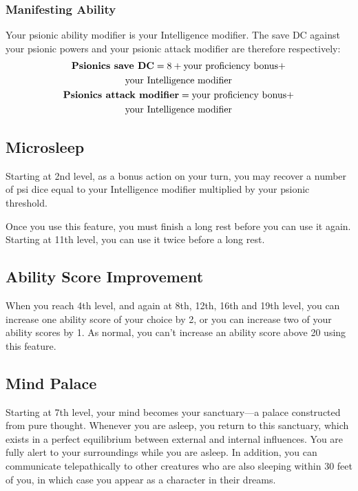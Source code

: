 \subsubsection{Manifesting Ability}
Your psionic ability modifier is your Intelligence modifier.
The save DC against your psionic powers and your
psionic attack modifier are therefore respectively:
\small\begin{equation*}
    \begin{gathered}
        \text{\textbf{Psionics save DC}}
            = 8 + \text{your proficiency bonus} + \\
                  \text{your Intelligence modifier} \\
        \text{\textbf{Psionics attack modifier}}
            = \text{your proficiency bonus} + \\
              \text{your Intelligence modifier}
    \end{gathered}
\end{equation*}\normalsize

\subsection{Microsleep}
Starting at 2nd level,
as a bonus action on your turn,
you may recover a number of psi dice equal to
your Intelligence modifier multiplied by your psionic threshold.

Once you use this feature,
you must finish a long rest before you can use it again.
Starting at 11th level,
you can use it twice before a long rest.

\subsection{Ability Score Improvement}
When you reach 4th level,
and again at 8th, 12th, 16th and 19th level,
you can increase one ability score of your choice by 2,
or you can increase two of your ability scores by 1.
As normal,
you can't increase an ability score above 20 using this feature.

\subsection{Mind Palace}
Starting at 7th level,
your mind becomes your sanctuary---a palace constructed
from pure thought.
Whenever you are asleep,
you return to this sanctuary,
which exists in a perfect equilibrium between
external and internal influences.
You are fully alert to your surroundings
while you are asleep.
In addition, you can communicate telepathically to other
creatures who are also sleeping within 30 feet of you,
in which case you appear as a character in their dreams.

